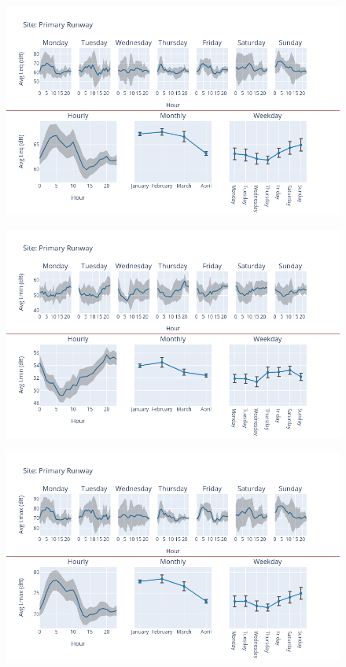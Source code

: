 \documentclass[12pt, oneside]{book}
\begin{document}
{ 
{\begin{figure}[H] 
 \centering 
\includegraphics[width=.88\textwidth, keepaspectratio]{image107} 
 \end{figure}}{} 

{\begin{figure}[H] 
 \centering 
\includegraphics[width=.88\textwidth, keepaspectratio]{image108} 
 \end{figure}}{} 

{\begin{figure}[H] 
 \centering 
\includegraphics[width=.88\textwidth, keepaspectratio]{image109} 
 \end{figure}}{} 

}
\end{document}
